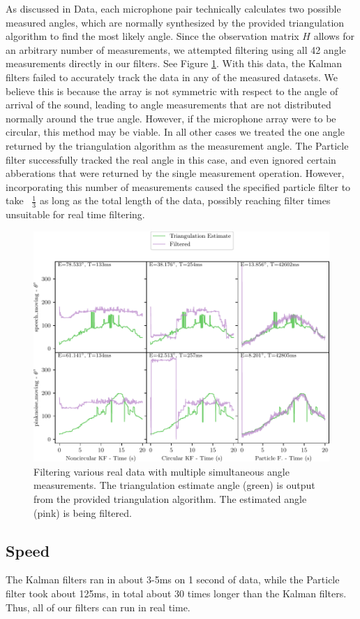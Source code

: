 \documentclass[11pt]{amsart}
\begin{document}
As discussed in Data, each microphone pair technically calculates two possible measured angles, which are normally synthesized by the provided triangulation algorithm to find the most likely angle. Since the observation matrix $H$ allows for an arbitrary number of measurements, we attempted filtering using all 42 angle measurements directly in our filters.  
See Figure \ref{fig:multiple_angles}. 
With this data, the Kalman filters failed to accurately track the data in any of the measured datasets. We believe this is because the array is not symmetric with respect to the angle of arrival of the sound, leading to angle measurements that are not distributed normally around the true angle. However, if the microphone array were to be circular, this method may be viable. In all other cases we treated the one angle returned by the triangulation algorithm as the measurement angle. The Particle filter successfully tracked the real angle in this case, and even ignored certain abberations that were returned by the single measurement operation. However, incorporating this number of measurements caused the specified particle filter to take ~$\frac{1}{3}$ as long as the total length of the data, possibly reaching filter times unsuitable for real time filtering.

\begin{figure}[htp]
    \centering
    \includegraphics[width=.75\textwidth]{actual_paper_graphs/multiple_angles.pdf}\hfill
    \caption{Filtering various real data with multiple simultaneous angle measurements. The triangulation estimate angle (green) is output from the provided triangulation algorithm. The estimated angle (pink) is being filtered.}
    \label{fig:multiple_angles}
\end{figure}

\subsection{Speed}
The Kalman filters ran in about 3-5ms on 1 second of data, while the Particle filter took about 125ms, in total about $30$ times longer than the Kalman filters.
Thus, all of our filters can run in real time. 
\end{document}
